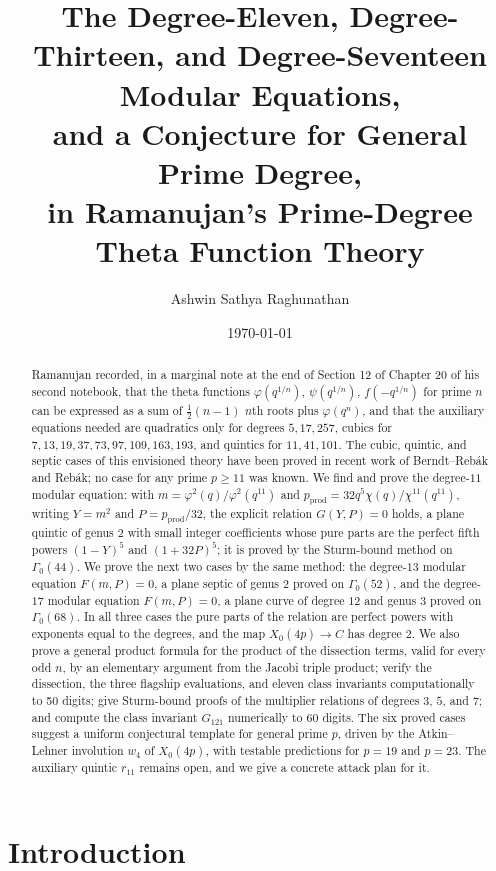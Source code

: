 \documentclass[11pt]{amsart}
\title[Modular equations of degrees 11, 13, 17, and a conjecture for general prime degree]{The Degree-Eleven, Degree-Thirteen, and Degree-Seventeen Modular Equations,\\ and a Conjecture for General Prime Degree,\\ in Ramanujan's Prime-Degree Theta Function Theory}
\author{Ashwin Sathya Raghunathan}
\date{\today}
\theoremstyle{plain}
\theoremstyle{definition}
\theoremstyle{remark}
\newcommand{\pprod}{p_{\mathrm{prod}}}
\begin{document}
\begin{abstract}
Ramanujan recorded, in a marginal note at the end of Section 12 of Chapter 20 of
his second notebook, that the theta functions $\varphi(q^{1/n})$, $\psi(q^{1/n})$,
$f(-q^{1/n})$ for prime $n$ can be expressed as a sum of $\frac12(n-1)$ $n$th roots
plus $\varphi(q^n)$, and that the auxiliary equations needed are quadratics only for
degrees $5, 17, 257$, cubics for $7, 13, 19, 37, 73, 97, 109, 163, 193$, and quintics
for $11, 41, 101$. The cubic, quintic, and septic cases of this envisioned theory
have been proved in recent work of Berndt--Reb\'ak and Reb\'ak; no case for any prime
$p \geq 11$ was known. We find and prove the degree-$11$ modular equation: with
$m = \varphi^2(q)/\varphi^2(q^{11})$ and $\pprod = 32q^5\chi(q)/\chi^{11}(q^{11})$,
writing $Y = m^2$ and $P = \pprod/32$, the explicit relation $G(Y,P) = 0$ holds,
a plane quintic of genus $2$ with small integer coefficients whose pure parts are
the perfect fifth powers $(1-Y)^5$ and $(1+32P)^5$; it is proved by the Sturm-bound
method on $\Gamma_0(44)$. We prove the next two cases by the same method: the
degree-$13$ modular equation $F(m,P) = 0$, a plane septic of genus $2$ proved on
$\Gamma_0(52)$, and the degree-$17$ modular equation $F(m,P) = 0$, a plane curve of
degree $12$ and genus $3$ proved on $\Gamma_0(68)$. In all three cases the pure parts
of the relation are perfect powers with exponents equal to the degrees, and the map
$X_0(4p) \to C$ has degree $2$. We also prove a general product formula for the product
of the dissection terms, valid for every odd $n$, by an elementary argument from the
Jacobi triple product; verify the dissection, the three flagship evaluations, and
eleven class invariants computationally to 50 digits; give Sturm-bound proofs of the
multiplier relations of degrees $3$, $5$, and $7$; and compute the class invariant
$G_{121}$ numerically to 60 digits. The six proved cases suggest a uniform
conjectural template for general prime $p$, driven by the Atkin--Lehner involution
$w_4$ of $X_0(4p)$, with testable predictions for $p = 19$ and $p = 23$.
The auxiliary quintic $r_{11}$ remains open, and
we give a concrete attack plan for it.
\end{abstract}

\maketitle

\section{Introduction}
\label{sec:intro}
\end{document}
